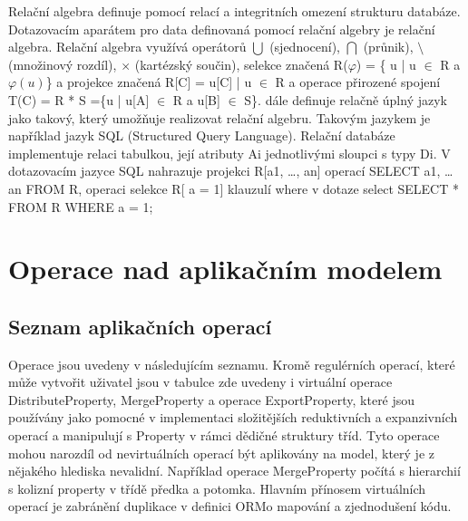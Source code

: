 \documentclass[11pt,twoside,a4paper]{book}
\begin{document}
Relační algebra definuje pomocí relací a integritních omezení strukturu
databáze. Dotazovacím aparátem pro data definovaná pomocí relační algebry je
relační algebra. Relační algebra využívá operátorů $\bigcup$ (sjednocení),
$\bigcap$ (průnik), $\setminus$ (množinový rozdíl), $\times$ (kartézský
součin), selekce značená R($\varphi $) = \{ u | u $\in$ R a  $\varphi(u)$\} a
projekce značená R[C] = { u[C] | u $\in$ R} a operace přirozené spojení T(C) =
R * S =\{u | u[A] $\in$ R a u[B] $\in$ S\}.
\cite{DBS_02} dále definuje relačně úplný jazyk jako takový, který
umožňuje realizovat relační algebru. Takovým jazykem je například jazyk SQL 
(Structured Query Language). Relační databáze implementuje relaci tabulkou, její
atributy Ai jednotlivými sloupci s typy Di. V dotazovacím jazyce SQL nahrazuje
projekci R[a1, \ldots , an] operací SELECT a1, \ldots an FROM R, operaci
selekce R[ a = 1] klauzulí where v dotaze select  SELECT * FROM R WHERE a = 1; 

\section{Operace nad aplikačním modelem} \label{app_ops}

\subsection{Seznam aplikačních operací}

Operace jsou uvedeny v následujícím seznamu. Kromě regulérních operací, které
může vytvořit uživatel jsou v tabulce zde uvedeny i virtuální operace
DistributeProperty, MergeProperty a operace ExportProperty, které jsou
používány jako pomocné v implementaci složitějších reduktivních a expanzivních
operací a manipulují s Property v rámci dědičné struktury tříd. Tyto operace
mohou narozdíl od nevirtuálních operací být aplikovány na model, který je z
nějakého hlediska nevalidní. Například operace MergeProperty počítá s
hierarchií s kolizní property v třídě předka a potomka. Hlavním přínosem
virtuálních operací je zabránění duplikace v definici ORMo mapování a
zjednodušení kódu.
\end{document}
